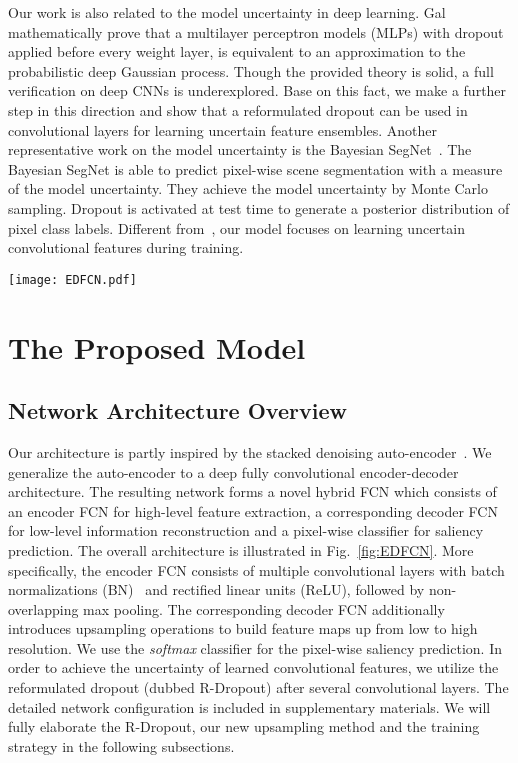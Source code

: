 \documentclass[10pt,twocolumn,letterpaper]{article}
\begin{document}
Our work is also related to the model uncertainty in deep learning.
Gal \etal~\cite{gal2015dropout} mathematically prove that a multilayer perceptron models (MLPs) with dropout applied before every weight layer, is equivalent to an approximation to the probabilistic deep Gaussian process.
Though the provided theory is solid, a full verification on deep CNNs is underexplored.
Base on this fact, we make a further step in this direction and show that a reformulated dropout can be used in convolutional layers for learning uncertain feature ensembles.
Another representative work on the model uncertainty is the Bayesian SegNet~\cite{kendall2015bayesian}.
The Bayesian SegNet is able to predict pixel-wise scene segmentation with a measure of the model uncertainty.
They achieve the model uncertainty by Monte Carlo sampling.
Dropout is activated at test time to generate a posterior distribution of pixel class labels.
Different from~\cite{kendall2015bayesian}, our model focuses on learning uncertain convolutional features during training.
\begin{figure*}
\begin{center}
\texttt{[image: EDFCN.pdf]}
\end{center}
\vspace{-4mm}
\caption{Overall architecture of the proposed UCF model.}
\label{fig:EDFCN}
\vspace{-5mm}
\end{figure*}
\section{The Proposed Model}
\subsection{Network Architecture Overview}
Our architecture is partly inspired by the stacked denoising auto-encoder~\cite{vincent2010stacked}.
We generalize the auto-encoder to a deep fully convolutional encoder-decoder architecture.
The resulting network forms a novel hybrid FCN which consists of an encoder FCN for high-level feature extraction, a corresponding decoder FCN for low-level information reconstruction and a pixel-wise classifier for saliency prediction.
The overall architecture is illustrated in Fig.~\ref{fig:EDFCN}.
More specifically, the encoder FCN consists of multiple convolutional layers with batch normalizations (BN)~\cite{ioffe2015batch} and rectified linear units (ReLU), followed by non-overlapping max pooling.
The corresponding decoder FCN additionally introduces upsampling operations to build feature maps up from low to high resolution. We use the \emph{softmax} classifier for the pixel-wise saliency prediction.
In order to achieve the uncertainty of learned convolutional features, we utilize the reformulated dropout (dubbed R-Dropout) after several convolutional layers.
The detailed network configuration is included in supplementary materials.
We will fully elaborate the R-Dropout, our new upsampling method and the training strategy in the following subsections.
\end{document}
